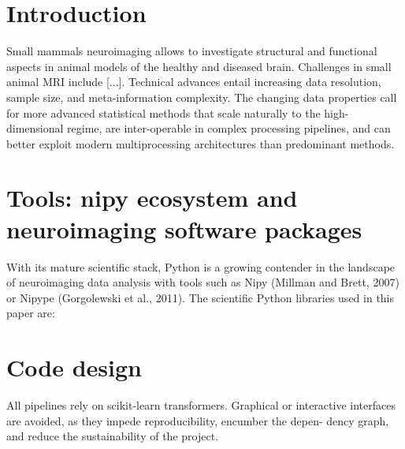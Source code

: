\documentclass[utf8, a4paper, final, crop]{frontiersSCNS} %
\begin{document}
\section{Introduction}
Small mammals neuroimaging allows to investigate structural and functional aspects in animal models of the healthy and diseased brain. Challenges in small animal MRI include [...].
Technical advances entail increasing data resolution, sample size, and meta-information complexity. 
The changing data properties call for more advanced statistical methods that scale naturally to the high-dimensional regime, are inter-operable in complex processing pipelines, and can better exploit modern multiprocessing architectures than predominant methods.
%
%

\section{Tools: nipy ecosystem and neuroimaging software packages}

With its mature scientific stack, Python is a growing contender
in the landscape of neuroimaging data analysis with tools such as
Nipy (Millman and Brett, 2007) or Nipype (Gorgolewski et al.,
2011). The scientific Python libraries used in this paper are:
%
%

\section{Code design}

All pipelines rely on scikit-learn transformers.
Graphical or interactive interfaces are avoided, as
they impede reproducibility, encumber the depen-
dency graph, and reduce the sustainability of the
project.
\end{document}
